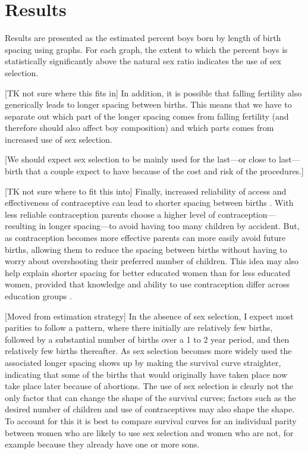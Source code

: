 \documentclass[12pt,letterpaper]{article}
\begin{document}
\section{Results\label{sec:results}}

Results are presented as the estimated percent boys born by length of birth spacing
using graphs.
For each graph, the extent to which the percent boys is statistically 
significantly above the natural sex ratio indicates the use of sex selection.


[TK not sure where this fits in]
In addition, it is possible that falling fertility also generically 
leads to longer spacing between births.
This means that we have to separate out which part of the longer
spacing comes from falling fertility (and therefore should also
affect boy composition) and which parts comes from increased use
of sex selection.

[We should expect sex selection to be mainly used for the last---or close to
last---birth that a couple expect to have because of the cost and risk
of the procedures.]


[TK not sure where to fit this into]
Finally, increased reliability of access and effectiveness of
contraceptive can lead to shorter spacing between births 
\citep{Keyfitz1971,Heckman1976}.
With less reliable contraception parents choose a higher level 
of contraception---resulting in longer spacing---to avoid having 
too many children by accident.
But, as contraception becomes more effective parents can more
easily avoid future births, allowing them to reduce the spacing 
between births without having to worry about overshooting their 
preferred number of children.
This idea may also help explain shorter spacing for better 
educated women than for less educated women, provided that   
knowledge and ability to use contraception differ
across education groups \citep{Tulasidhar1993,Whitworth2002}.

[Moved from estimation strategy]
In the absence of sex selection, I expect most parities to follow
a pattern, where there initially are relatively few births, 
followed by a substantial number of births over a 1 to 2 year period, and then
relatively few births thereafter.
As sex selection becomes more widely used the associated
longer spacing shows up by making the survival curve straighter,
indicating that some of the births that would originally have taken place
now take place later because of abortions.
The use of sex selection is clearly not the only factor that can change the shape of
the survival curves; factors such as the desired number of children and
use of contraceptives may also shape the shape.
To account for this it is best to compare survival curves for an individual
parity between women who are likely to use sex selection and women who are
not, for example because they already have one or more sons.
\end{document}
